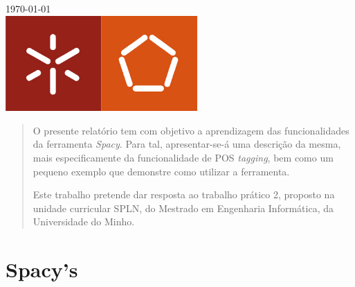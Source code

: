 \documentclass[12pt]{article}
\begin{document}
\begin{titlepage}
{\large \today}\\[1.5cm] %


\includegraphics[width=0.55\textwidth]{logo}\\[1cm] %
 

\vfill %

\end{titlepage}

\vspace{0.5cm}

\begin{abstract}
O presente relatório tem com objetivo a aprendizagem das funcionalidades da ferramenta \textit{Spacy}. Para tal, apresentar-se-á uma descrição da mesma, mais especificamente da
funcionalidade de POS \textit{tagging}, bem como um pequeno exemplo que demonstre como utilizar a ferramenta.

Este trabalho pretende dar resposta ao trabalho prático 2, proposto na unidade curricular SPLN, do Mestrado em Engenharia Informática, da Universidade do Minho.
\end{abstract}

\vspace{0.5cm}

\tableofcontents

\newpage

\let\oldref\ref
\renewcommand{\ref}[1]{\smash{\underline{\oldref{#1}}}}

\section{Spacy's}
\end{document}
